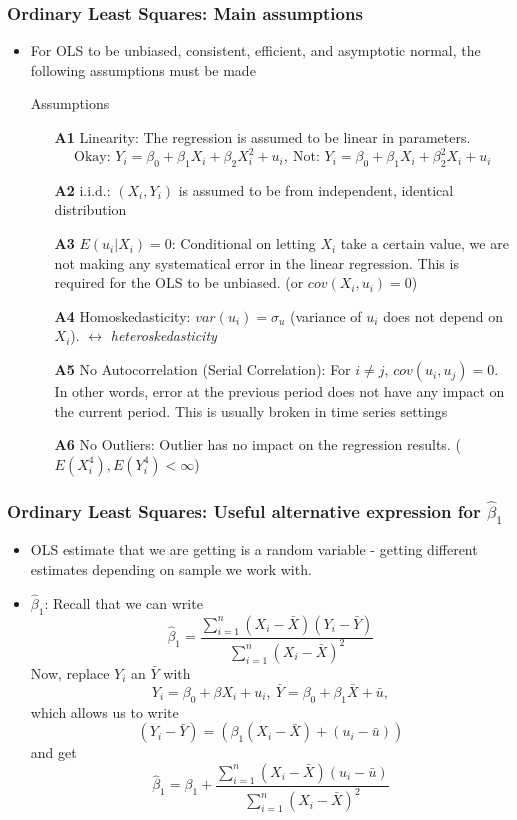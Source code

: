 \documentclass[aspectratio=169]{beamer}
\begin{document}
\begin{frame}
\frametitle{Ordinary Least Squares: Main assumptions}
\begin{itemize}
\item For OLS to be unbiased, consistent, efficient, and asymptotic normal, the following assumptions must be made
\begin{block}{Assumptions}
\begin{itemize}
\item[\textbf{A1}] Linearity: The regression is assumed to be linear in parameters.
\[
\text{Okay: } Y_i = \beta_0 + \beta_1X_i + \beta_2X_i^2+u_i, \ \text{Not: } Y_i = \beta_0 + \beta_1X_i + \beta_2^2X_i+u_i
\]
\item[\textbf{A2}] i.i.d.: $(X_i,Y_i)$ is assumed to be from independent, identical distribution
\item[\textbf{A3}] $E(u_i|X_i)=0$: Conditional on letting $X_i$ take a certain value, we are not making any systematical error in the linear regression. This is required for the OLS to be unbiased. (or $cov(X_i, u_i)=0$)
\item[\textbf{A4}] Homoskedasticity: $var(u_i)=\sigma_u$ (variance of $u_i$ does not depend on $X_i$). $\leftrightarrow$ \textit{heteroskedasticity}
\item[\textbf{A5}] No Autocorrelation (Serial Correlation): For $i\neq j$, $cov(u_i,u_j)=0$. In other words, error at the previous period does not have any impact on the current period. This is usually broken in time series settings
\item[\textbf{A6}] No Outliers: Outlier has no impact on the regression results. ($E(X_i^4), E(Y_i^4)<\infty$)
\end{itemize}
\end{block}
\end{itemize}
\end{frame}



\begin{frame}
\frametitle{Ordinary Least Squares: Useful alternative expression for $\hat{\beta}_1$ }
\begin{itemize}
\item OLS estimate that we are getting is a random variable - getting different estimates depending on sample we work with. 
\item$\hat{\beta}_1$: Recall that we can write
\[
\hat{\beta}_1= \frac{\sum_{i=1}^n(X_i-\bar{X})(Y_i-\bar{Y})}{\sum_{i=1}^n(X_i-\bar{X})^2}
\]
Now, replace $Y_i$ an $\bar{Y}$ with 
\[
Y_i =\beta_0 + \beta X_i + u_i, \ \bar{Y} = \beta_0 + \beta_1\bar{X} + \bar{u},
\]
which allows us to write 
\[
(Y_i-\bar{Y}) = (\beta_1(X_i-\bar{X})+(u_i-\bar{u}))
\]
and get
\[
\hat{\beta}_1=\beta_1+  \frac{\sum_{i=1}^n(X_i-\bar{X})(u_i-\bar{u})}{\sum_{i=1}^n(X_i-\bar{X})^2}
\]

\end{itemize}
\end{frame}
\end{document}
